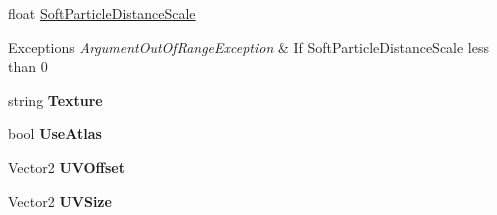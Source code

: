 \begin{DoxyCompactItemize}
\item 
\hypertarget{class_s_e_mod_a_p_i_1_1_a_p_i_1_1_definitions_1_1_transparent_materials_definition_a36461eea8b021f858feac7ec81daa4cd}{}float \hyperlink{class_s_e_mod_a_p_i_1_1_a_p_i_1_1_definitions_1_1_transparent_materials_definition_a36461eea8b021f858feac7ec81daa4cd}{Soft\+Particle\+Distance\+Scale}\label{class_s_e_mod_a_p_i_1_1_a_p_i_1_1_definitions_1_1_transparent_materials_definition_a36461eea8b021f858feac7ec81daa4cd}

\begin{DoxyCompactList}\small\item\em 
\begin{DoxyExceptions}{Exceptions}
{\em Argument\+Out\+Of\+Range\+Exception} & If Soft\+Particle\+Distance\+Scale less than 0\\
\hline
\end{DoxyExceptions}
\end{DoxyCompactList}\item 
\hypertarget{class_s_e_mod_a_p_i_1_1_a_p_i_1_1_definitions_1_1_transparent_materials_definition_aa9fde3dc6c1712102d7d2f7eea9dc40c}{}string {\bfseries Texture}\label{class_s_e_mod_a_p_i_1_1_a_p_i_1_1_definitions_1_1_transparent_materials_definition_aa9fde3dc6c1712102d7d2f7eea9dc40c}

\item 
\hypertarget{class_s_e_mod_a_p_i_1_1_a_p_i_1_1_definitions_1_1_transparent_materials_definition_a796ac3b47e73c4218a744ef7065151a5}{}bool {\bfseries Use\+Atlas}\label{class_s_e_mod_a_p_i_1_1_a_p_i_1_1_definitions_1_1_transparent_materials_definition_a796ac3b47e73c4218a744ef7065151a5}

\item 
\hypertarget{class_s_e_mod_a_p_i_1_1_a_p_i_1_1_definitions_1_1_transparent_materials_definition_a076573a362c4d9bba0fa401a519e58fc}{}Vector2 {\bfseries U\+V\+Offset}\label{class_s_e_mod_a_p_i_1_1_a_p_i_1_1_definitions_1_1_transparent_materials_definition_a076573a362c4d9bba0fa401a519e58fc}

\item 
\hypertarget{class_s_e_mod_a_p_i_1_1_a_p_i_1_1_definitions_1_1_transparent_materials_definition_ac9154960c0ae4f7063135bafa4d102d2}{}Vector2 {\bfseries U\+V\+Size}\label{class_s_e_mod_a_p_i_1_1_a_p_i_1_1_definitions_1_1_transparent_materials_definition_ac9154960c0ae4f7063135bafa4d102d2}

\end{DoxyCompactItemize}
